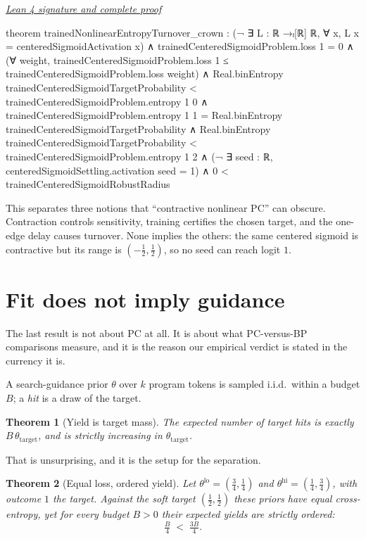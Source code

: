 \documentclass[11pt]{article}
\newtheorem{theorem}{Theorem}[section]
\newcommand{\leancommit}{647168959fc57cfe97526d9525d33e63681b8e2f}
\newcommand{\leansignaturelink}[2]{%
  \par\Needspace{0.3\textheight}\smallskip\noindent
  \href{https://github.com/zariuq/MeTTapedia/blob/\leancommit/#1\#L#2}{%
    \scriptsize\itshape Lean 4 signature and complete proof}\par\nobreak}
\begin{document}
\leansignaturelink{lean/mettapedia/Mettapedia/MachineLearning/NeuralNetworks/%
PredictiveCoding/TrainedNonlinearTurnover.lean}{432}
\begin{leansignature}
theorem trainedNonlinearEntropyTurnover_crown :
    (¬ ∃ L : ℝ →ₗ[ℝ] ℝ, ∀ x, L x = centeredSigmoidActivation x) ∧
      trainedCenteredSigmoidProblem.loss 1 = 0 ∧
      (∀ weight, trainedCenteredSigmoidProblem.loss 1 ≤
        trainedCenteredSigmoidProblem.loss weight) ∧
      Real.binEntropy trainedCenteredSigmoidTargetProbability <
        trainedCenteredSigmoidProblem.entropy 1 0 ∧
      trainedCenteredSigmoidProblem.entropy 1 1 =
        Real.binEntropy trainedCenteredSigmoidTargetProbability ∧
      Real.binEntropy trainedCenteredSigmoidTargetProbability <
        trainedCenteredSigmoidProblem.entropy 1 2 ∧
      (¬ ∃ seed : ℝ, centeredSigmoidSettling.activation seed = 1) ∧
      0 < trainedCenteredSigmoidRobustRadius
\end{leansignature}

This separates three notions that ``contractive nonlinear PC'' can obscure. Contraction
controls sensitivity, training certifies the chosen target, and the one-edge delay causes
turnover. None implies the others: the same centered sigmoid is contractive but its range
is $(-\tfrac12,\tfrac12)$, so no seed can reach logit $1$.

\section{Fit does not imply guidance}
\label{sec:yield}

The last result is not about PC at all. It is about what PC-versus-BP comparisons
measure, and it is the reason our empirical verdict is stated in the currency it is.

A search-guidance prior $\theta$ over $k$ program tokens is sampled i.i.d.\ within a
budget $B$; a \emph{hit} is a draw of the target.

\begin{theorem}[Yield is target mass]\label{thm:yield}
The expected number of target hits is exactly $B\,\theta_{\mathrm{target}}$, and is
strictly increasing in $\theta_{\mathrm{target}}$.
\end{theorem}

That is unsurprising, and it is the setup for the separation.

\begin{theorem}[Equal loss, ordered yield]\label{thm:sep}
Let $\theta^{\mathrm{lo}} = (\tfrac34,\tfrac14)$ and
$\theta^{\mathrm{hi}} = (\tfrac14,\tfrac34)$, with outcome $1$ the target. Against the
soft target $(\tfrac12,\tfrac12)$ these priors have \emph{equal} cross-entropy, yet for
every budget $B > 0$ their expected yields are strictly ordered:
\[
\tfrac{B}{4} \;<\; \tfrac{3B}{4}.
\]
\end{theorem}
\end{document}
